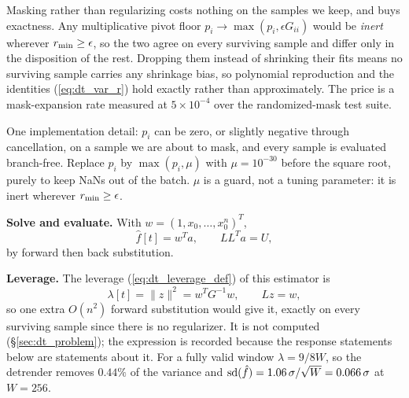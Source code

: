 \documentclass{article}
\numberwithin{equation}{section}   %
\begin{document}
Masking rather than regularizing costs nothing on the samples we keep, and buys exactness.  Any multiplicative
pivot floor $p_i \rightarrow \max(p_i, \epsilon G_{ii})$ would be {\em inert} wherever $r_{\rm min} \ge
\epsilon$, so the two agree on every surviving sample and differ only in the disposition of the rest.  Dropping
them instead of shrinking their fits means no surviving sample carries any shrinkage bias, so polynomial
reproduction and the identities (\ref{eq:dt_var_r}) hold exactly rather than approximately.  The price is a
mask-expansion rate measured at $5\times10^{-4}$ over the randomized-mask test suite.

One implementation detail: $p_i$ can be zero, or slightly negative through cancellation, on a sample we are
about to mask, and every sample is evaluated branch-free.  Replace $p_i$ by $\max(p_i, \mu)$ with
$\mu = 10^{-30}$ before the square root, purely to keep NaNs out of the batch.  $\mu$ is a guard, not a tuning
parameter: it is inert wherever $r_{\rm min} \ge \epsilon$.

{\bf Solve and evaluate.}  With $w = (1, x_0, \ldots, x_0^n)^T$,
\begin{equation}
\hat f[t] = w^T a, \qquad L L^T a = U ,
\end{equation}
by forward then back substitution.

{\bf Leverage.}  The leverage (\ref{eq:dt_leverage_def}) of this estimator is
\begin{equation}
\lambda[t] = \|z\|^2 = w^T G^{-1} w , \qquad Lz = w ,
\label{eq:dt_leverage}
\end{equation}
so one extra $O(n^2)$ forward substitution would give it, exactly on every surviving sample since there is no
regularizer.  It is not computed (\S\ref{sec:dt_problem}); the expression is recorded because the response
statements below are statements about it.  For a fully valid window $\lambda = 9/8W$, so the detrender removes
$0.44\%$ of the variance and ${\rm sd}(\hat f) = 1.06\,\sigma/\sqrt{W} = 0.066\,\sigma$ at $W = 256$.
\end{document}
